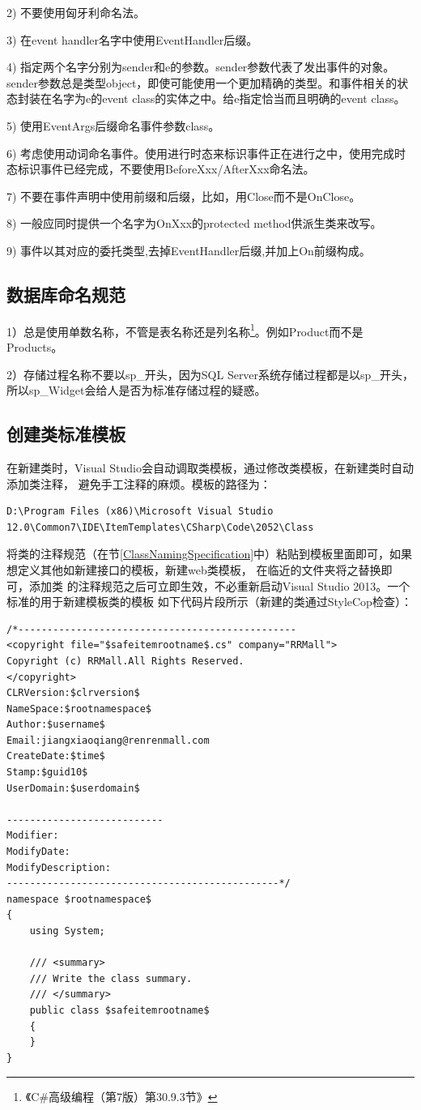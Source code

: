 \documentclass{book}
\begin{document}
2)  不要使用匈牙利命名法。

3)  在event handler名字中使用EventHandler后缀。

4)  指定两个名字分别为sender和e的参数。sender参数代表了发出事件的对象。sender参数总是类型object，即使可能使用一个更加精确的类型。和事件相关的状态封装在名字为e的event class的实体之中。给e指定恰当而且明确的event class。

5)  使用EventArgs后缀命名事件参数class。

6)  考虑使用动词命名事件。使用进行时态来标识事件正在进行之中，使用完成时态标识事件已经完成，不要使用BeforeXxx/AfterXxx命名法。

7)  不要在事件声明中使用前缀和后缀，比如，用Close而不是OnClose。

8)  一般应同时提供一个名字为OnXxx的protected method供派生类来改写。

9) 事件以其对应的委托类型,去掉EventHandler后缀,并加上On前缀构成。

\subsection{数据库命名规范}

1）总是使用单数名称，不管是表名称还是列名称\footnote{《C\#高级编程（第7版）第30.9.3节》}。例如Product而不是Products。	

2）存储过程名称不要以sp\_开头，因为SQL Server系统存储过程都是以sp\_开头，所以sp\_Widget会给人是否为标准存储过程的疑惑。

\subsection{创建类标准模板}

在新建类时，Visual Studio会自动调取类模板，通过修改类模板，在新建类时自动添加类注释，
避免手工注释的麻烦。模板的路径为：
\begin{lstlisting}
D:\Program Files (x86)\Microsoft Visual Studio 12.0\Common7\IDE\ItemTemplates\CSharp\Code\2052\Class
\end{lstlisting}

将类的注释规范（在节\ref{ClassNamingSpecification}中）粘贴到模板里面即可，如果想定义其他如新建接口的模板，新建web类模板，
在临近的文件夹将之替换即可，添加类
的注释规范之后可立即生效，不必重新启动Visual Studio 2013。一个标准的用于新建模板类的模板
如下代码片段所示（新建的类通过StyleCop检查）：

\begin{lstlisting}[language={[Sharp]C}]
/*------------------------------------------------
<copyright file="$safeitemrootname$.cs" company="RRMall">
Copyright (c) RRMall.All Rights Reserved.
</copyright>
CLRVersion:$clrversion$
NameSpace:$rootnamespace$ 
Author:$username$
Email:jiangxiaoqiang@renrenmall.com
CreateDate:$time$
Stamp:$guid10$
UserDomain:$userdomain$

---------------------------
Modifier:
ModifyDate:
ModifyDescription:
-----------------------------------------------*/
namespace $rootnamespace$
{
	using System;
	
	/// <summary>
    /// Write the class summary. 
    /// </summary>
    public class $safeitemrootname$
    {
    }
}
\end{lstlisting}
\end{document}
